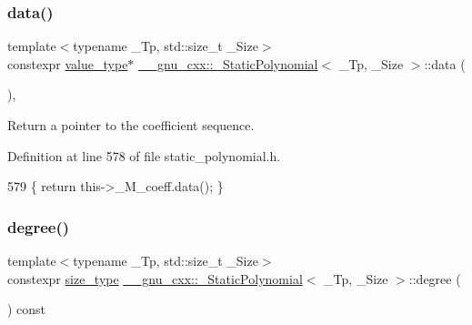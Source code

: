 \subsubsection{\texorpdfstring{data()}{data()}\hspace{0.1cm}{\footnotesize\ttfamily [2/2]}}
{\footnotesize\ttfamily template$<$typename \+\_\+\+Tp, std\+::size\+\_\+t \+\_\+\+Size$>$ \\
constexpr \hyperlink{class____gnu__cxx_1_1__StaticPolynomial_aad5f3d6d5876b6926b30724aeac649d6}{value\+\_\+type}$\ast$ \hyperlink{class____gnu__cxx_1_1__StaticPolynomial}{\+\_\+\+\_\+gnu\+\_\+cxx\+::\+\_\+\+Static\+Polynomial}$<$ \+\_\+\+Tp, \+\_\+\+Size $>$\+::data (\begin{DoxyParamCaption}{ }\end{DoxyParamCaption})\hspace{0.3cm}{\ttfamily [inline]}, {\ttfamily [noexcept]}}

Return a {\ttfamily pointer} to the coefficient sequence. 

Definition at line 578 of file static\+\_\+polynomial.\+h.


\begin{DoxyCode}
579       \{ \textcolor{keywordflow}{return} this->\_M\_coeff.data(); \}
\end{DoxyCode}
\mbox{\label{class____gnu__cxx_1_1__StaticPolynomial_a5977dac3a84e8a43f3e9da28b62ca46a}} 
\subsubsection{\texorpdfstring{degree()}{degree()}}
{\footnotesize\ttfamily template$<$typename \+\_\+\+Tp, std\+::size\+\_\+t \+\_\+\+Size$>$ \\
constexpr \hyperlink{class____gnu__cxx_1_1__StaticPolynomial_a0cc0aa4adab35686ef2474e07f511ff9}{size\+\_\+type} \hyperlink{class____gnu__cxx_1_1__StaticPolynomial}{\+\_\+\+\_\+gnu\+\_\+cxx\+::\+\_\+\+Static\+Polynomial}$<$ \+\_\+\+Tp, \+\_\+\+Size $>$\+::degree (\begin{DoxyParamCaption}{ }\end{DoxyParamCaption}) const\hspace{0.3cm}{\ttfamily [inline]}}

